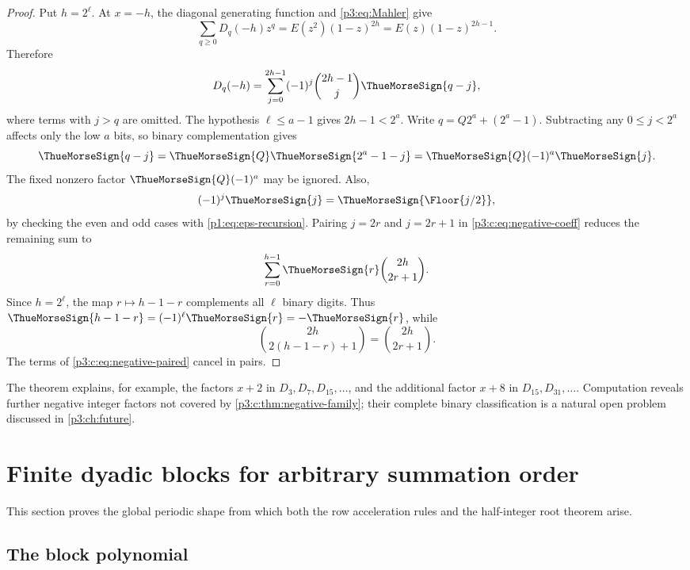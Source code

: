 \documentclass[11pt,oneside]{article}
\numberwithin{equation}{section}
\theoremstyle{definition}
\theoremstyle{remark}
\begin{document}
\begin{proof}
Put \(h=2^\ell\).  At \(x=-h\), the diagonal generating function and
\cref{p3:eq:Mahler} give
\[
 \sum_{q\geq0}D_q(-h)z^q
 =E(z^2)(1-z)^{2h}
 =E(z)(1-z)^{2h-1}.
\]
Therefore
\begin{equation}
 D_q(-h)=\sum_{j=0}^{2h-1}
 (-1)^j\binom{2h-1}{j}\ThueMorseSign{q-j},                         \label{p3:c:eq:negative-coeff}
\end{equation}
where terms with \(j>q\) are omitted.  The hypothesis
\(\ell\leq a-1\) gives \(2h-1<2^a\).  Write
\(q=Q2^a+(2^a-1)\).  Subtracting any \(0\leq j<2^a\) affects only the low
\(a\) bits, so binary complementation gives
\[
 \ThueMorseSign{q-j}=\ThueMorseSign{Q}\ThueMorseSign{2^a-1-j}
 =\ThueMorseSign{Q}(-1)^a\ThueMorseSign{j}.
\]
The fixed nonzero factor \(\ThueMorseSign{Q}(-1)^a\) may be ignored.  Also,
\[
 (-1)^j\ThueMorseSign{j}=\ThueMorseSign{\Floor{j/2}},
\]
by checking the even and odd cases with \cref{p1:eq:eps-recursion}.  Pairing
\(j=2r\) and \(j=2r+1\) in \cref{p3:c:eq:negative-coeff} reduces the remaining
sum to
\begin{equation}
 \sum_{r=0}^{h-1}\ThueMorseSign{r}\binom{2h}{2r+1}.                  \label{p3:c:eq:negative-paired}
\end{equation}
Since \(h=2^\ell\), the map \(r\mapsto h-1-r\) complements all \(\ell\)
binary digits.  Thus
\(\ThueMorseSign{h-1-r}=(-1)^\ell\ThueMorseSign{r}=-\ThueMorseSign{r}\), while
\[
 \binom{2h}{2(h-1-r)+1}=\binom{2h}{2r+1}.
\]
The terms of \cref{p3:c:eq:negative-paired} cancel in pairs.
\end{proof}

The theorem explains, for example, the factors \(x+2\) in
\(D_3,D_7,D_{15},\ldots\), and the additional factor
\(x+8\) in \(D_{15},D_{31},\ldots\).  Computation reveals further
negative integer factors not covered by \cref{p3:c:thm:negative-family}; their
complete binary classification is a natural open problem discussed in
\cref{p3:ch:future}.
\section{Finite dyadic blocks for arbitrary summation order}\label{p3:ch:blocks}

This section proves the global periodic shape from which both the row
acceleration rules and the half-integer root theorem arise.

\subsection{The block polynomial}
\end{document}
